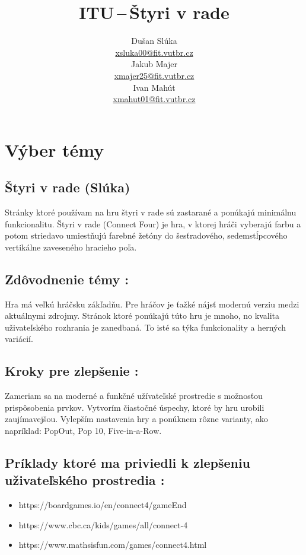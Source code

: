 \documentclass[a4paper, 11pt, onecolumn]{article}
\title{ITU\,--\,Štyri v rade}
\author{Dušan Slúka \\ \href{mailto:xsluka00@fit.vutbr.cz}{xsluka00@fit.vutbr.cz}\\
        Jakub Majer \\ \href{mailto:xmajer25@vutbr.cz}{xmajer25@fit.vutbr.cz}\\
        Ivan Mahút \\ \href{mailto:xmahut01@vutbr.cz}{xmahut01@fit.vutbr.cz}}
\date{}
\begin{document}
\maketitle

\section{Výber témy}
\subsection{Štyri v rade (Slúka)}
Stránky ktoré používam na hru štyri v rade sú zastarané a ponúkajú minimálnu funkcionalitu.
Štyri v rade (Connect Four) je hra, v ktorej hráči vyberajú farbu a potom striedavo umiestňujú farebné 
žetóny do šesťradového, sedemstĺpcového vertikálne zaveseného hracieho poľa. 


\subsection*{Zdôvodnenie témy :} 
Hra má veľkú hráčsku zákľadňu. Pre hráčov je ťažké nájsť modernú verziu medzi aktuálnymi zdrojmy. Stránok ktoré
ponúkajú túto hru je mnoho, no kvalita uživateľského rozhrania je zanedbaná. To isté sa týka funkcionality a herných variácií.

\subsection*{Kroky pre zlepšenie :} 
Zameriam sa na moderné a funkčné užívateľské prostredie s možnosťou prispôsobenia prvkov. 
Vytvorím čiastočné úspechy, ktoré by hru urobili zaujímavejšou. 
Vylepším nastavenia hry a ponúknem rôzne varianty, ako napríklad: PopOut, Pop 10, Five-in-a-Row.
\subsection*{Príklady ktoré ma priviedli k zlepšeniu uživateľského prostredia :} 
\begin{itemize}
  \item https://boardgames.io/en/connect4/gameEnd
  \item https://www.cbc.ca/kids/games/all/connect-4
  \item https://www.mathsisfun.com/games/connect4.html
\end{itemize}
\end{document}
